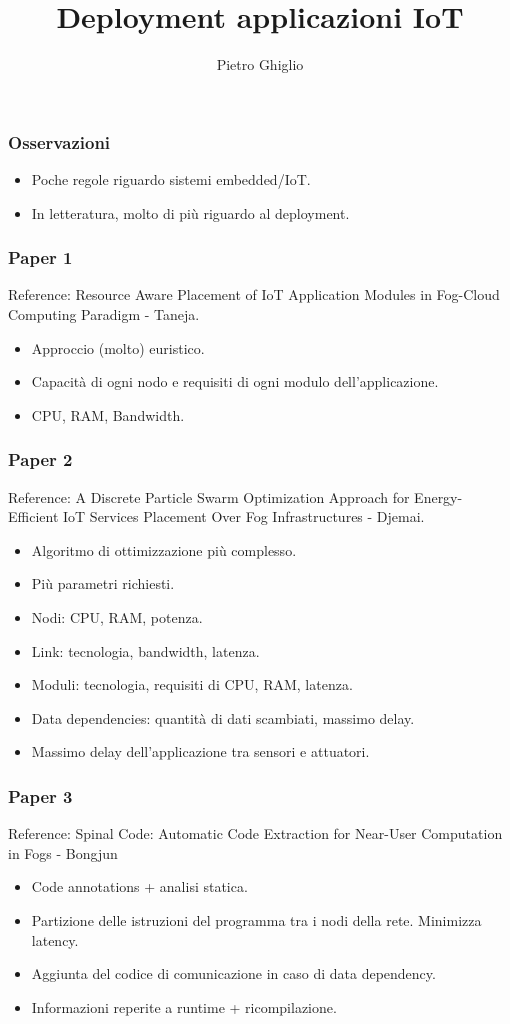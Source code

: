 \documentclass{beamer}
\title{Deployment applicazioni IoT}
\author{Pietro Ghiglio}
\begin{document}
\titlepage

\begin{frame}
\frametitle{Osservazioni}
\begin{itemize}
\item Poche regole riguardo sistemi embedded/IoT.
\item In letteratura, molto di più riguardo al deployment.
\end{itemize}
\end{frame}

\begin{frame}
\frametitle{Paper 1}
Reference: Resource Aware Placement of IoT Application Modules in Fog-Cloud Computing Paradigm - Taneja.
\begin{itemize}
\item Approccio (molto) euristico.
\item Capacità di ogni nodo e requisiti di ogni modulo dell'applicazione.
\item CPU, RAM, Bandwidth.
\end{itemize}
\end{frame}

\begin{frame}
\frametitle{Paper 2}
Reference: A Discrete Particle Swarm Optimization Approach for Energy-Efficient IoT Services Placement Over Fog Infrastructures
- Djemai.
\begin{itemize}
\item Algoritmo di ottimizzazione più complesso.
\item Più parametri richiesti.
\item Nodi: CPU, RAM, potenza.
\item Link: tecnologia, bandwidth, latenza.
\item Moduli: tecnologia, requisiti di CPU, RAM, latenza.
\item Data dependencies: quantità di dati scambiati, massimo delay.
\item Massimo delay dell'applicazione tra sensori e attuatori.
\end{itemize}
\end{frame}

\begin{frame}
\frametitle{Paper 3}
Reference: Spinal Code: Automatic Code Extraction for Near-User Computation in Fogs - Bongjun
\newline\newline
\begin{itemize}
\item Code annotations + analisi statica.
\item Partizione delle istruzioni del programma tra i nodi della rete. Minimizza latency.
\item Aggiunta del codice di comunicazione in caso di data dependency.
\item Informazioni reperite a runtime + ricompilazione.
\end{itemize}

\end{frame}
\end{document}
